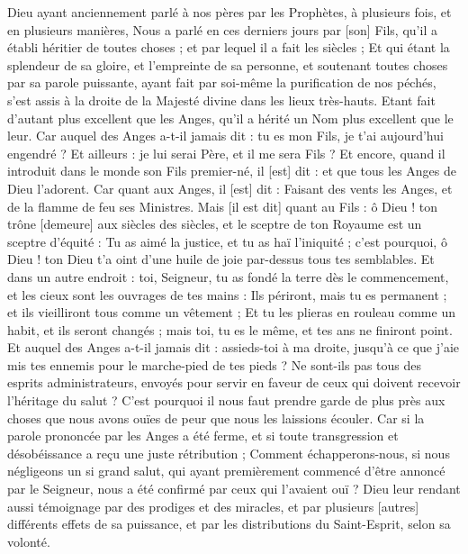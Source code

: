\BFont
\begin{multicols}{2}
\VerseOne{}Dieu ayant anciennement parlé à nos pères par les Prophètes, à plusieurs fois, et en plusieurs manières,
Nous a parlé en ces derniers jours par [son] Fils, qu'il a établi héritier de toutes choses ; et par lequel il a fait les siècles ;
Et qui étant la splendeur de sa gloire, et l'empreinte de sa personne, et soutenant toutes choses par sa parole puissante, ayant fait par soi-même la purification de nos péchés, s'est assis à la droite de la Majesté divine dans les lieux très-hauts.
Etant fait d'autant plus excellent que les Anges, qu'il a hérité un Nom plus excellent que le leur.
Car auquel des Anges a-t-il jamais dit : tu es mon Fils, je t'ai aujourd'hui engendré ? Et ailleurs : je lui serai Père, et il me sera Fils ?
Et encore, quand il introduit dans le monde son Fils premier-né, il [est] dit : et que tous les Anges de Dieu l'adorent.
Car quant aux Anges, il [est] dit : Faisant des vents les Anges, et de la flamme de feu ses Ministres.
Mais [il est dit] quant au Fils : ô Dieu ! ton trône [demeure] aux siècles des siècles, et le sceptre de ton Royaume est un sceptre d'équité :
Tu as aimé la justice, et tu as haï l'iniquité ; c'est pourquoi, ô Dieu ! ton Dieu t'a oint d'une huile de joie par-dessus tous tes semblables.
Et dans un autre endroit : toi, Seigneur, tu as fondé la terre dès le commencement, et les cieux sont les ouvrages de tes mains :
Ils périront, mais tu es permanent ; et ils vieilliront tous comme un vêtement ;
Et tu les plieras en rouleau comme un habit, et ils seront changés ; mais toi, tu es le même, et tes ans ne finiront point.
Et auquel des Anges a-t-il jamais dit : assieds-toi à ma droite, jusqu'à ce que j'aie mis tes ennemis pour le marche-pied de tes pieds ?
Ne sont-ils pas tous des esprits administrateurs, envoyés pour servir en faveur de ceux qui doivent recevoir l'héritage du salut ?
\VerseOne{}C'est pourquoi il nous faut prendre garde de plus près aux choses que nous avons ouïes de peur que nous les laissions écouler.
Car si la parole prononcée par les Anges a été ferme, et si toute transgression et désobéissance a reçu une juste rétribution ;
Comment échapperons-nous, si nous négligeons un si grand salut, qui ayant premièrement commencé d'être annoncé par le Seigneur, nous a été confirmé par ceux qui l'avaient ouï ?
Dieu leur rendant aussi témoignage par des prodiges et des miracles, et par plusieurs [autres] différents effets de sa puissance, et par les distributions du Saint-Esprit, selon sa volonté.

\end{multicols}
